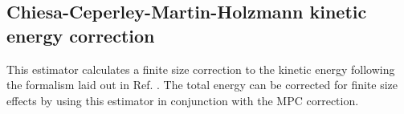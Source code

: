 

\subsection{Chiesa-Ceperley-Martin-Holzmann kinetic energy correction}

This estimator calculates a finite size correction to the kinetic energy following the formalism laid out in Ref. \cite{Chiesa2006}.  The total energy can be corrected for finite size effects by using this estimator in conjunction with the MPC correction.


